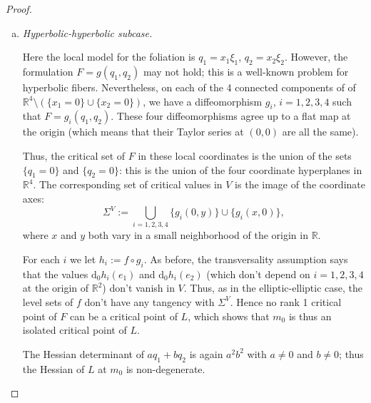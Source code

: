 \documentclass[11pt]{article}
\newcommand{\DD}{\mathrm{d}}
\newcommand{\RM}{\mathbb{R}}
\begin{document}
\begin{proof}
\begin{enumerate}[(a)]
  The focus-focus critical point is isolated, so we just need to prove
  that the Hessian of $L$ is non-degenerate. But the 2-jet of $L$ is
  \begin{align*}
    L(m)-L(m_0) &= (\partial_1 f)(F(m_0)(J(m) - J (m_0))\\
    & \qquad + (\partial_2 f)(F(m_0)(H(m) - H(m_0)) + \text{terms of
      order } 3.
  \end{align*}
  Thus, in normal form coordinates (see Theorem
  \ref{singularities_theorem}), as in the previous case, it has the
  form $a q_1 + b q_2$, where this time $q_1$ and $q_2$ are the
  focus-focus quadratic forms given in
  Theorem~\ref{singularities_theorem}(iii). The Hessian determinant is
  now $(a^2+b^2)^2$, which does not vanish.

\item{\emph{Hyperbolic\--hyperbolic subcase.}}

  Here the local model for the foliation is $q_1=x_1\xi_1$,
  $q_2=x_2\xi_2$. However, the formulation $F=g(q_1,q_2)$ may not
  hold; this is a well-known problem for hyperbolic fibers.
  Nevertheless, on each of the 4 connected components of of
  $\RM^4\setminus(\{x_1=0\}\cup \{x_2=0\})$, we have a diffeomorphism
  $g_i$, $i={1,2,3,4}$ such that $F=g_i(q_1,q_2)$. These four
  diffeomorphisms agree up to a flat map at the origin (which means
  that their Taylor series at $(0,0)$ are all the same).

  Thus, the critical set of $F$ in these local coordinates is the
  union of the sets $\{q_1=0\}$ and $\{q_2=0\}$: this is the union of
  the four coordinate hyperplanes in $\RM^4$.  The corresponding set
  of critical values in $V$ is the image of the coordinate axes:
  \[
  \Sigma^V:=\bigcup_{i=1,2,3,4}\{g_i(0,y)\}\cup\{g_i(x,0)\},
  \]
  where $x$ and $y$ both vary in a small neighborhood of the origin in
  $\RM$.

  For each $i$ we let $h_i:=f\circ g_i$. As before, the transversality
  assumption says that the values $\DD_0 h_i(e_1)$ and $\DD_0
  h_i(e_2)$ (which don't depend on $i=1,2,3,4$ at the origin of
  $\RM^2$) don't vanish in $V$. Thus, as in the elliptic-elliptic
  case, the level sets of $f$ don't have any tangency with
  $\Sigma^V$. Hence no rank 1 critical point of $F$ can be a critical
  point of $L$, which shows that $m_0$ is thus an isolated critical
  point of $L$.

  The Hessian determinant of $aq_1+bq_2$ is again $a^2b^2$ with $a
  \neq 0$ and $b \neq 0$; thus the Hessian of $L$ at $m_0$ is
  non-degenerate.


\end{enumerate}
\end{proof}
\end{document}
